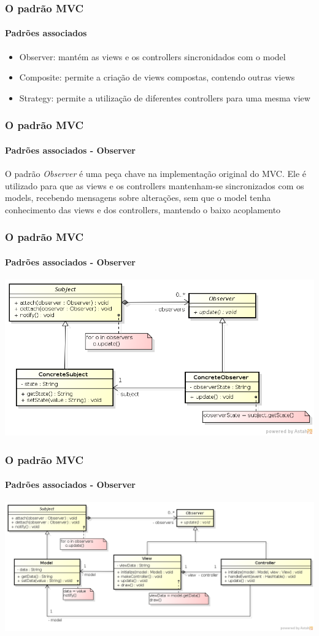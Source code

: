 \documentclass{beamer}
\begin{document}
\begin{frame}
\frametitle{O padrão MVC}
\framesubtitle{Padrões associados}
\begin{itemize}
	\item Observer: mantém as views e os controllers sincronidados com o model
	\item Composite: permite a criação de views compostas, contendo outras views
	\item Strategy: permite a utilização de diferentes controllers para uma mesma view
\end{itemize}
\end{frame}

\begin{frame}
\frametitle{O padrão MVC}
\framesubtitle{Padrões associados - Observer}
	O padrão \textit{Observer} é uma peça chave na implementação original do MVC. Ele é utilizado para que as views e os controllers mantenham-se sincronizados com os models, recebendo mensagens sobre alterações, sem que o model tenha conhecimento das views e dos controllers, mantendo o baixo acoplamento
\end{frame}

\begin{frame}
\frametitle{O padrão MVC}
\framesubtitle{Padrões associados - Observer}
	\begin{center}
		\includegraphics[scale=0.45]{Observer.png}
	\end{center}
\end{frame}

\begin{frame}
\frametitle{O padrão MVC}
\framesubtitle{Padrões associados - Observer}
	\begin{center}
		\includegraphics[scale=0.32]{ClassicMVC.png}
	\end{center}
\end{frame}
\end{document}
